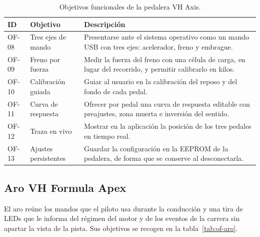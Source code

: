 \begin{table}[htbp]
	\centering
	\caption{Objetivos funcionales de la pedalera VH Axis.}
	\label{tab:of-pedalera}
	\small
	\begin{tabularx}{\textwidth}{@{}l>{\raggedright\arraybackslash}p{3.6cm}X@{}}
		\toprule
		\textbf{ID} & \textbf{Objetivo} & \textbf{Descripción} \\
		\midrule
		OF-08 & Tres ejes de mando &
		Presentarse ante el sistema operativo como un mando USB con tres ejes: acelerador, freno y embrague. \\
		OF-09 & Freno por fuerza &
		Medir la fuerza del freno con una célula de carga, en lugar del recorrido, y permitir calibrarlo en kilos. \\
		OF-10 & Calibración guiada &
		Guiar al usuario en la calibración del reposo y del fondo de cada pedal. \\
		OF-11 & Curva de respuesta &
		Ofrecer por pedal una curva de respuesta editable con preajustes, zona muerta e inversión del sentido. \\
		OF-12 & Traza en vivo &
		Mostrar en la aplicación la posición de los tres pedales en tiempo real. \\
		OF-13 & Ajustes persistentes &
		Guardar la configuración en la EEPROM de la pedalera, de forma que se conserve al desconectarla. \\
		\bottomrule
	\end{tabularx}
\end{table}

\subsection{Aro VH Formula Apex}
\label{subsec:of-aro}

El aro reúne los mandos que el piloto usa durante la conducción y una tira de LEDs que le informa del régimen del motor y de los eventos de la carrera sin apartar la vista de la pista. Sus objetivos se recogen en la tabla~\ref{tab:of-aro}.

